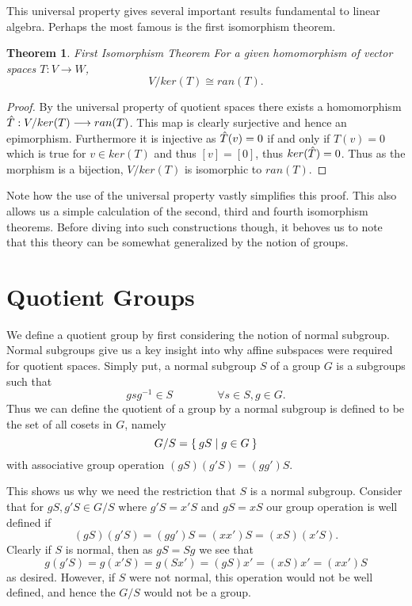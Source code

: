 \documentclass[12pt]{extarticle}
\newtheorem*{theorem}{Theorem}
\renewcommand{\to}[0]{\longrightarrow}
\begin{document}
This universal property gives several important results fundamental to linear algebra. Perhaps the most famous is the first isomorphism theorem. 

\begin{theorem}{First Isomorphism Theorem}
    For a given homomorphism of vector spaces $T : V \to W$, 
    \[
      V / ker(T) \cong ran(T).
    \]
\end{theorem}
\begin{proof}
  By the universal property of quotient spaces there exists a homomorphism $\Hat{T} : V / ker(T) \to ran(T)$. This map is clearly surjective and hence an epimorphism. Furthermore it is injective as $\Hat{T}(v) = 0$ if and only if $T(v) = 0$ which is true for $v \in ker(T)$ and thus $[v] = [0]$, thus $ker(\Hat{T}) = 0$. Thus as the morphism is a bijection, $V/ker(T)$ is isomorphic to $ran(T)$.
\end{proof}

Note how the use of the universal property vastly simplifies this proof. This also allows us a simple calculation of the second, third and fourth isomorphism theorems. Before diving into such constructions though, it behoves us to note that this theory can be somewhat generalized by the notion of groups. 

\section*{Quotient Groups}

 We define a quotient group by first considering the notion of normal subgroup. Normal subgroups give us a key insight into why affine subspaces were required for quotient spaces. Simply put, a normal subgroup $S$ of a group $G$ is a subgroups such that 
\[
  gsg^{-1} \in S\qquad \qquad \forall s \in S, g \in G.
\]
Thus we can define the quotient of a group by a normal subgroup is defined to be the set of all  cosets in $G$, namely 
\[
  G/S = \Set{ gS \mid g \in G}
\]
with associative group operation $(gS)(g'S) = (gg')S$.

This shows us why we need the restriction that $S$ is a normal subgroup. Consider that for $gS, g'S \in G /S$ where $g'S = x'S$ and $gS = xS$ our group operation is well defined if
\[
  (gS)(g'S) = (gg')S = (xx')S = (xS)(x'S).
\]  
Clearly if $S$ is normal, then as $gS = Sg$ we see that 
\[
  g(g'S) = g(x'S) = g(Sx') = (gS)x' = (xS)x' = (xx')S
\] 
as desired. However, if $S$ were not normal, this operation would not be well defined, and hence the $G/S$ would not be a group. 
\end{document}
